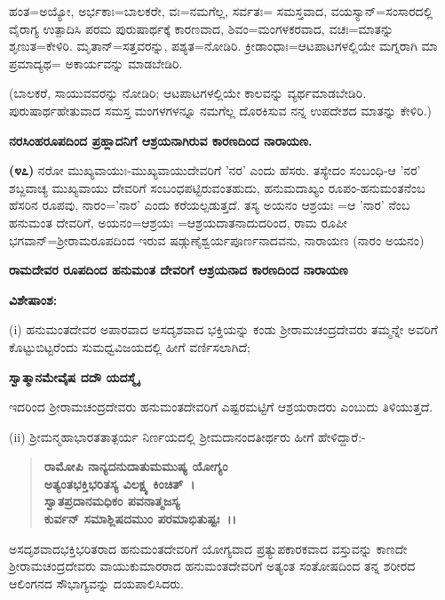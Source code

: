 ಹಂತ=ಅಯ್ಯೋ, ಅರ್ಭಕಾಃ=ಬಾಲಕರೇ, ವಃ=ನಮಗೆಲ್ಲ, ಸರ್ವತಃ= ಸಮಸ್ತವಾದ, ವಯಸ್ಯಾನ್=ಸಂಸಾರದಲ್ಲಿ ವೈರಾಗ್ಯ ಉತ್ಪಾದಿಸಿ ಪರಮ ಪುರುಷಾರ್ಥಕ್ಕೆ ಕಾರಣವಾದ, ಶಿವಂ=ಮಂಗಳಕರವಾದ, ವಚಃ=ಮಾತನ್ನು ಶೃಣುತ=ಕೇಳಿರಿ. ಮೃತಾನ್=ಸತ್ತವರನ್ನು, ಪಶ್ಯತ=ನೋಡಿರಿ. ಕ್ರೀಡಾಂಧಾಃ=ಆಟಪಾಟಗಳಲ್ಲಿಯೇ ಮಗ್ನರಾಗಿ ಮಾ ಪ್ರಮಾದ್ಯಥ= ಅಕಾರ್ಯವನ್ನು ಮಾಡಬೇಡಿರಿ.

(ಬಾಲಕರೆ, ಸಾಯುವವರನ್ನು ನೋಡಿರಿ; ಆಟಪಾಟಗಳಲ್ಲಿಯೇ ಕಾಲವನ್ನು ವ್ಯರ್ಥಮಾಡಬೇಡಿರಿ. ಪುರುಷಾರ್ಥಹೇತುವಾದ ಸಮಸ್ತ ಮಂಗಳಗಳನ್ನೂ ನಮಗೆಲ್ಲ ದೊರಕಿಸುವ ನನ್ನ ಉಪದೇಶದ ಮಾತನ್ನು ಕೇಳಿರಿ.)

\textbf{ನರಸಿಂಹರೂಪದಿಂದ ಪ್ರಹ್ಲಾದನಿಗೆ ಆಶ್ರಯನಾಗಿರುವ ಕಾರಣದಿಂದ ನಾರಾಯಣ.}

\textbf{(೪೭)} ನರೋ ಮುಖ್ಯವಾಯುಃ-ಮುಖ್ಯವಾಯುದೇವರಿಗೆ 'ನರ' ಎಂದು ಹೆಸರು. ತಸ್ಯೇದಂ ಸಂಬಂಧಿ-ಆ 'ನರ' ಶಬ್ದವಾಚ್ಯ ಮುಖ್ಯವಾಯು ದೇವರಿಗೆ ಸಂಬಂಧಪಟ್ಟಿರು\-ವಂತಹುದು, ಹನುಮದಾಖ್ಯಂ ರೂಪಂ-ಹನುಮಂತನೆಂಬ ಹೆಸರಿನ ರೂಪವು, ನಾರಂ='ನಾರ' ಎಂದು ಕರೆಯಲ್ಪಡುತ್ತದೆ. ತಸ್ಯ ಅಯನಂ ಆಶ್ರಯಃ =ಆ 'ನಾರ' ನೆಂಬ ಹನುಮಂತ ದೇವರಿಗೆ, ಅಯನಂ=ಆಶ್ರಯಃ =ಆಶ್ರಯದಾತನಾದುದರಿಂದ, ರಾಮ ರೂಪೀ ಭಗವಾನ್=ಶ‍್ರೀರಾಮರೂಪದಿಂದ ಇರುವ ಷಡ್ಗುಣೈಶ್ವರ್ಯಪೂರ್ಣನಾದವನು, ನಾರಾಯಣ (ನಾರಂ ಅಯನಂ)

\begin{center}
\textbf{ರಾಮದೇವರ ರೂಪದಿಂದ ಹನುಮಂತ ದೇವರಿಗೆ ಆಶ್ರಯನಾದ ಕಾರಣದಿಂದ ನಾರಾಯಣ}
\end{center}

\noindent
\textbf{ವಿಶೇಷಾಂಶ:\enginline{-}}

(i) ಹನುಮಂತದೇವರ ಅಪಾರವಾದ ಅಸದೃಶವಾದ ಭಕ್ತಿಯನ್ನು ಕಂಡು ಶ‍್ರೀರಾಮಚಂದ್ರ\-ದೇವರು ತಮ್ಮನ್ನೇ ಅವರಿಗೆ ಕೊಟ್ಟುಬಿಟ್ಟರೆಂದು ಸುಮಧ್ವವಿಜಯದಲ್ಲಿ ಹೀಗೆ ವರ್ಣಿಸಲಾಗಿದೆ;

\begin{center}
\textbf{ಸ್ವಾತ್ಮಾನಮೇವೈಷ ದದೌ ಯದಸ್ಮೈ}
\end{center}

\noindent
ಇದರಿಂದ ಶ‍್ರೀರಾಮಚಂದ್ರದೇವರು ಹನುಮಂತದೇವರಿಗೆ ಎಷ್ಟರಮಟ್ಟಿಗೆ ಆಶ್ರಯರಾದರು ಎಂಬುದು ತಿಳಿಯುತ್ತದೆ.

(ii) ಶ‍್ರೀಮನ್ಮಹಾಭಾರತತಾತ್ಪರ್ಯ ನಿರ್ಣಯದಲ್ಲಿ ಶ‍್ರೀಮದಾನಂದತೀರ್ಥರು ಹೀಗೆ ಹೇಳಿದ್ದಾರೆ:-

\begin{verse}
\textbf{ರಾಮೋಪಿ ನಾನ್ಯದನುದಾತುಮಮುಷ್ಯ ಯೋಗ್ಯಂ}\\\textbf{ಅತ್ಯಂತಭಕ್ತಿಭರಿತಸ್ಯ ವಿಲಕ್ಷ್ಯ ಕಿಂಚಿತ್~।}\\\textbf{ಸ್ವಾತಪ್ರದಾನಮಧಿಕಂ ಪವನಾತ್ಮಜಸ್ಯ}\\\textbf{ಕುರ್ವನ್ ಸಮಾಶ್ಲಿಷದಮುಂ ಪರಮಾಭಿತುಷ್ಟಃ~।।}
\end{verse}

\noindent
ಅಸದೃಶವಾದಭಕ್ತಿಭರಿತರಾದ ಹನುಮಂತದೇವರಿಗೆ ಯೋಗ್ಯವಾದ ಪ್ರತ್ಯುಪಕಾರಕವಾದ ವಸ್ತುವನ್ನು ಕಾಣದೇ ಶ‍್ರೀರಾಮಚಂದ್ರದೇವರು ವಾಯುಕುಮಾರರಾದ ಹನುಮಂತದೇವರಿಗೆ ಅತ್ಯಂತ ಸಂತೋಷದಿಂದ ತನ್ನ ಶರೀರದ ಆಲಿಂಗನದ ಸೌಭಾಗ್ಯವನ್ನು ದಯಪಾಲಿಸಿದರು.

